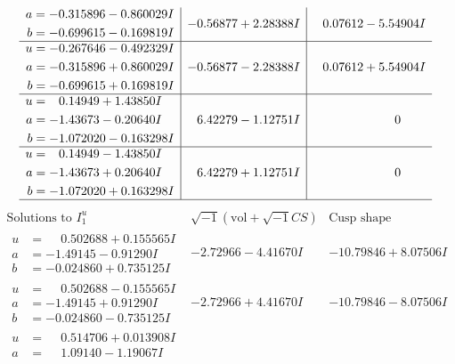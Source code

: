\documentclass[1p]{elsarticle_modified}
\theoremstyle{definition}
\newcommand{\I}{\sqrt{-1}}
\begin{document}
$$\begin{array}{c|c|c}
\begin{aligned}
a &= -0.315896 - 0.860029 I \\
b &= -0.699615 - 0.169819 I\end{aligned}
 & -0.56877 + 2.28388 I & \phantom{-}0.07612 - 5.54904 I \\ \hline\begin{aligned}
u &= -0.267646 - 0.492329 I \\
a &= -0.315896 + 0.860029 I \\
b &= -0.699615 + 0.169819 I\end{aligned}
 & -0.56877 - 2.28388 I & \phantom{-}0.07612 + 5.54904 I \\ \hline\begin{aligned}
u &= \phantom{-}0.14949 + 1.43850 I \\
a &= -1.43673 - 0.20640 I \\
b &= -1.072020 - 0.163298 I\end{aligned}
 & \phantom{-}6.42279 - 1.12751 I & \phantom{-0.000000 } 0 \\ \hline\begin{aligned}
u &= \phantom{-}0.14949 - 1.43850 I \\
a &= -1.43673 + 0.20640 I \\
b &= -1.072020 + 0.163298 I\end{aligned}
 & \phantom{-}6.42279 + 1.12751 I & \phantom{-0.000000 } 0\\
 \hline 
 \end{array}$$\newpage$$\begin{array}{c|c|c}  
\text{Solutions to }I^u_{1}& \I (\text{vol} + \sqrt{-1}CS) & \text{Cusp shape}\\
 \hline 
\begin{aligned}
u &= \phantom{-}0.502688 + 0.155565 I \\
a &= -1.49145 - 0.91290 I \\
b &= -0.024860 + 0.735125 I\end{aligned}
 & -2.72966 - 4.41670 I & -10.79846 + 8.07506 I \\ \hline\begin{aligned}
u &= \phantom{-}0.502688 - 0.155565 I \\
a &= -1.49145 + 0.91290 I \\
b &= -0.024860 - 0.735125 I\end{aligned}
 & -2.72966 + 4.41670 I & -10.79846 - 8.07506 I \\ \hline\begin{aligned}
u &= \phantom{-}0.514706 + 0.013908 I \\
a &= \phantom{-}1.09140 - 1.19067 I \\

\end{aligned}
\end{array}$$
\end{document}
